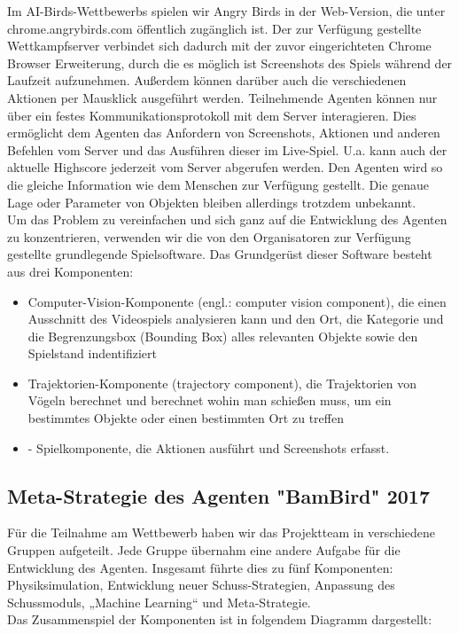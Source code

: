 Im AI-Birds-Wettbewerbs spielen wir Angry Birds in der Web-Version, die unter chrome.angrybirds.com öffentlich zugänglich ist. Der zur Verfügung gestellte Wettkampfserver verbindet sich dadurch mit der zuvor eingerichteten Chrome Browser Erweiterung, durch die es möglich ist Screenshots des Spiels während der Laufzeit aufzunehmen. Außerdem können darüber auch die verschiedenen Aktionen per Mausklick ausgeführt werden. Teilnehmende Agenten können nur über ein festes Kommunikationsprotokoll mit dem Server interagieren. Dies ermöglicht dem Agenten das Anfordern von Screenshots, Aktionen und anderen Befehlen vom Server und das Ausführen dieser im Live-Spiel. U.a. kann auch der aktuelle Highscore jederzeit vom Server abgerufen werden. Den Agenten wird so die gleiche Information wie dem Menschen zur Verfügung gestellt. Die genaue Lage oder Parameter von Objekten bleiben allerdings trotzdem unbekannt.\\
Um das Problem zu vereinfachen und sich ganz auf die Entwicklung des Agenten zu konzentrieren, verwenden wir die von den Organisatoren zur Verfügung gestellte grundlegende Spielsoftware. Das Grundgerüst dieser Software besteht aus drei Komponenten:

\begin{itemize}
\item Computer-Vision-Komponente (engl.: computer vision component), die einen Ausschnitt des Videospiels analysieren kann und den Ort, die Kategorie und die Begrenzungsbox (Bounding Box) alles relevanten Objekte sowie den Spielstand indentifiziert
\item Trajektorien-Komponente (trajectory component), die Trajektorien von Vögeln berechnet und berechnet wohin man schießen muss, um ein bestimmtes Objekte oder einen bestimmten Ort zu treffen
\item -	Spielkomponente, die Aktionen ausführt und Screenshots erfasst.
\end{itemize}

\subsection{Meta-Strategie des Agenten "BamBird" 2017}
Für die Teilnahme am Wettbewerb haben wir das Projektteam in verschiedene Gruppen aufgeteilt. Jede Gruppe übernahm eine andere Aufgabe für die Entwicklung des Agenten. Insgesamt führte dies zu fünf Komponenten: Physiksimulation, Entwicklung neuer Schuss-Strategien, Anpassung des Schussmoduls, „Machine Learning“ und Meta-Strategie.\\
Das Zusammenspiel der Komponenten ist in folgendem Diagramm dargestellt:

